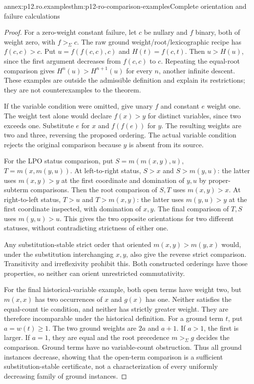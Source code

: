 \begin{annexitem}{annex:p12.ro.examples}{thm:p12-ro-comparison-examples}{Complete orientation and failure calculations}
\begin{proof}
For a zero-weight constant failure, let \(c\) be nullary and
\(f\) binary, both of weight zero, with \(f>_\Sigma c\).
The raw ground weight/root/lexicographic recipe has
\(f(c,c)>c\). Put \(u=f(f(c,c),c)\) and \(H(t)=f(c,t)\).
Then \(u>H(u)\), since the first argument decreases from
\(f(c,c)\) to \(c\). Repeating the equal-root comparison gives
\(H^n(u)>H^{n+1}(u)\) for every \(n\), another infinite descent.
These examples are outside the admissible definition and explain its
restrictions; they are not counterexamples to the theorem.

If the variable condition were omitted, give unary \(f\) and
constant \(e\) weight one. The weight test alone would declare
\(f(x)>y\) for distinct variables, since two exceeds one.
Substitute \(e\) for \(x\) and \(f(f(e))\) for \(y\).
The resulting weights are two and three, reversing the proposed
ordering. The actual variable condition rejects the original comparison
because \(y\) is absent from its source.

For the LPO status comparison, put
\(S=m(m(x,y),u)\), \(T=m(x,m(y,u))\).
At left-to-right status, \(S>x\) and
\(S>m(y,u)\): the latter uses \(m(x,y)>y\) at the first
coordinate and domination of \(y,u\) by proper-subterm comparisons.
Then the root comparison of \(S,T\) uses \(m(x,y)>x\).
At right-to-left status, \(T>u\) and \(T>m(x,y)\): the latter
uses \(m(y,u)>y\) at the first coordinate inspected, with
domination of \(x,y\). The final comparison of \(T,S\) uses
\(m(y,u)>u\). This gives the two opposite orientations for two
different statuses, without contradicting strictness of either one.

Any substitution-stable strict order that oriented
\(m(x,y)>m(y,x)\) would, under the substitution interchanging
\(x,y\), also give the reverse strict comparison. Transitivity
and irreflexivity prohibit this. Both constructed orderings have those
properties, so neither can orient unrestricted commutativity.

For the final historical-variable example, both open terms have
weight two, but \(m(x,x)\) has two occurrences of \(x\) and
\(g(x)\) has one. Neither satisfies the equal-count tie condition,
and neither has strictly greater weight. They are therefore incomparable
under the historical definition. For a ground term \(t\), put
\(a=w(t)\geq1\). The two ground weights are \(2a\) and
\(a+1\). If \(a>1\), the first is larger. If \(a=1\), they
are equal and the root precedence \(m>_\Sigma g\) decides the
comparison. Ground terms have no variable-count obstruction. Thus
all ground instances decrease, showing that the open-term comparison
is a sufficient substitution-stable certificate, not a characterization
of every uniformly decreasing family of ground instances.
\end{proof}
\end{annexitem}
